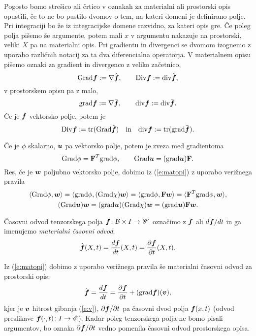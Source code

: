 Pogosto bomo strešico ali črtico v oznakah za materialni ali prostorski opis opustili,
če to ne bo pustilo dvomov o tem, na kateri domeni je definirano polje.
Pri integraciji bo že iz integracijske domene razvidno, za kateri opis gre.
Če poleg polja pišemo še argumente, potem mali $x$ v argumentu nakazuje na prostorski,
veliki $X$ pa na materialni opis.
Pri gradientu in divergenci se dvomom izognemo z uporabo različnih notacij
za ta dva diferencialna operatorja.
V materialnem opisu pišemo oznaki za gradient in divergenco z veliko začetnico,
\[ \mathrm{Grad}\boldsymbol f:=\nabla\hat{\boldsymbol f},\qquad \mathrm {Div}\boldsymbol f:=\mathrm{div}\hat{\boldsymbol f}, \]
v prostorskem opisu pa z malo,
\[ \mathrm{grad}\boldsymbol f:=\nabla\bar{\boldsymbol f},\qquad \mathrm{div}\boldsymbol f:=\mathrm{div}\bar{\boldsymbol f}. \]
Če je $\boldsymbol f$ vektorsko polje, potem je
\[
	\mathrm {Div}\boldsymbol f:=\mathrm{tr}(\mathrm{Grad}\hat{\boldsymbol f})\quad\textrm{in}\quad
	\mathrm{div}\boldsymbol f:=\mathrm{tr}(\mathrm{grad}\bar{\boldsymbol f}).
\]

Če je $\phi$ skalarno, $\boldsymbol u$ pa vektorsko polje, potem je zveza med gradientoma
\begin{equation}\label{e:gz}
	\mathrm{Grad}\phi=\mathbf F^{T}\mathrm{grad}\phi,\qquad \mathrm{Grad}\boldsymbol u=(\mathrm{grad}\boldsymbol u)\mathbf F.
\end{equation}
Res, če je $\boldsymbol w$ poljubno vektorsko polje, dobimo iz (\ref{e:matopi})
z uporabo verižnega pravila
\begin{gather*}
	\langle\mathrm{Grad}\phi,\boldsymbol w\rangle=\langle\mathrm{grad}\phi,(\mathrm{Grad}\chi)\boldsymbol w\rangle=
	\langle\mathrm{grad}\phi, \mathbf F\boldsymbol w\rangle=\langle\mathbf F^{T}\mathrm{grad}\phi,\boldsymbol w\rangle, \\
	(\mathrm{Grad}\boldsymbol u)\boldsymbol w=(\mathrm{grad}\boldsymbol u)(\mathrm{Grad}\chi)\boldsymbol w
	=(\mathrm{grad}\boldsymbol u)\mathbf F\boldsymbol w.
\end{gather*}

\begin{definicija}
	Časovni odvod tenzorskega polja $\boldsymbol f\colon \mathcal B\times I\to\mathscr W$ označimo z
	$\dot{\boldsymbol f}$ ali $d\boldsymbol f/dt$ in ga imenujemo \emph{materialni časovni odvod};
	\[ \dot{\boldsymbol f}(X,t)=\frac{d\boldsymbol f}{dt}(X,t)=\frac{\partial\boldsymbol f}{\partial t}(X,t). \]
\end{definicija}
Iz (\ref{e:matopi}) dobimo z uporabo verižnega pravila še materialni časovni odvod za prostorski opis:
\begin{equation} \label{e:matodv}
	\dot{\boldsymbol f}=\frac{d\boldsymbol f}{dt}=
	\frac{\partial\boldsymbol f}{\partial t}+(\mathrm{grad}\boldsymbol f)(\boldsymbol v),
\end{equation}
kjer je $\boldsymbol v$ hitrost gibanja (\ref{e:v}), $\partial\boldsymbol f/\partial t$ pa
časovni dvod polja $\boldsymbol f(x,t)$ (odvod preslikave $\boldsymbol f(\cdot,t)\colon I\to\mathscr E$).
Kadar poleg tenzorskega polja ne bomo pisali argumentov,
bo oznaka $\partial\boldsymbol f/\partial t$ vedno pomenila časovni odvod prostorskega opisa.

